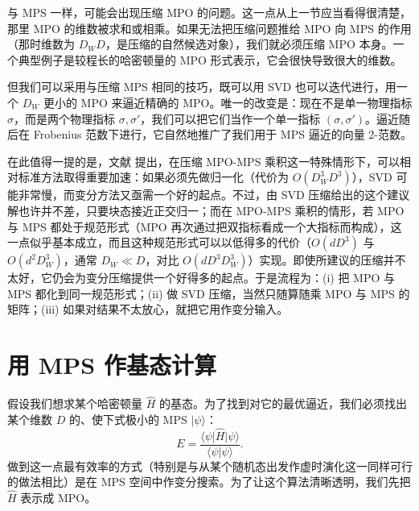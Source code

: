 \documentclass[a4paper,10pt,oneside,onecolumn,1p,times]{elsarticle}
\newcommand{\bra}[1]{\mbox{$\langle #1  |$}}
\newcommand{\ket}[1]{\mbox{$| #1  \rangle$}}
\newcommand{\braket}[2]{\mbox{$\langle #1  | #2 \rangle$}} 	%
\begin{document}
与 MPS 一样，可能会出现压缩 MPO 的问题。这一点从上一节应当看得很清楚，那里 MPO 的维数被求和或相乘。如果无法把压缩问题推给 MPO 向 MPS 的作用（那时维数为 $D_W D$，是压缩的自然候选对象），我们就必须压缩 MPO 本身。一个典型例子是较程长的哈密顿量的 MPO 形式表示，它会很快导致很大的维数。

但我们可以采用与压缩 MPS 相同的技巧，既可以用 SVD 也可以迭代进行，用一个 $D_W$ 更小的 MPO 来逼近精确的 MPO。唯一的改变是：现在不是单一物理指标 $\sigma$，而是两个物理指标 $\sigma,\sigma'$，我们可以把它们当作一个单一指标 $(\sigma,\sigma')$。逼近随后在 Frobenius 范数下进行，它自然地推广了我们用于 MPS 逼近的向量 2-范数。

在此值得一提的是，文献 \cite{Stoudenmire10} 提出，在压缩 MPO-MPS 乘积这一特殊情形下，可以相对标准方法取得重要加速：如果必须先做归一化（代价为 $O(D_W^3 D^3)$），SVD 可能非常慢，而变分方法又亟需一个好的起点。不过，由 SVD 压缩给出的这个建议解也许并不差，只要块态接近正交归一；而在 MPO-MPS 乘积的情形，若 MPO 与 MPS 都处于规范形式（MPO 再次通过把双指标看成一个大指标而构成），这一点似乎基本成立，而且这种规范形式可以以低得多的代价（$O(d D^3)$ 与 $O(d^2 D_W^3)$，通常 $D_W \ll D$，对比 $O(d D^3 D_W^3)$）实现。即使所建议的压缩并不太好，它仍会为变分压缩提供一个好得多的起点。于是流程为：(i) 把 MPO 与 MPS 都化到同一规范形式；(ii) 做 SVD 压缩，当然只随算随乘 MPO 与 MPS 的矩阵；(iii) 如果对结果不太放心，就把它用作变分输入。


 
\section{用 MPS 作基态计算}
\label{sec:groundstates}
假设我们想求某个哈密顿量 $\hat{H}$ 的基态。为了找到对它的最优逼近，我们必须找出某个维数 $D$ 的、使下式极小的 MPS $\ket{\psi}$：
\begin{equation}
E = \frac{\bra{\psi} \hat{H} \ket{\psi}}{\braket{\psi}{\psi}} .
\end{equation} 
做到这一点最有效率的方式（特别是与从某个随机态出发作虚时演化这一同样可行的做法相比）是在 MPS 空间中作变分搜索。为了让这个算法清晰透明，我们先把 $\hat{H}$ 表示成 MPO。
\end{document}
